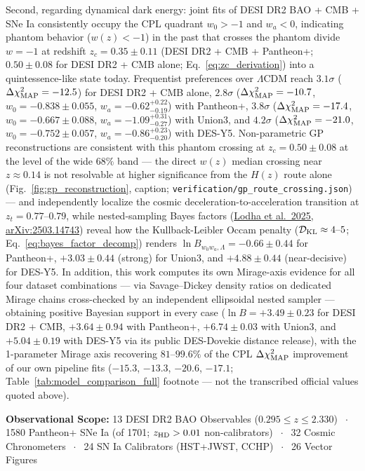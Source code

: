 \documentclass[11pt,letterpaper]{article}
\begin{document}
{Second, regarding dynamical dark energy: joint fits of DESI DR2 BAO + CMB + SNe Ia consistently occupy the CPL quadrant $w_0 > -1$ and $w_a < 0$, indicating phantom behavior ($w(z) < -1$) in the past that crosses the phantom divide $w = -1$ at redshift $z_c = 0.35 \pm 0.11$ (DESI DR2 + CMB + Pantheon+; $0.50 \pm 0.08$ for DESI DR2 + CMB alone; Eq.~\ref{eq:zc_derivation}) into a quintessence-like state today. Frequentist preferences over $\Lambda$CDM reach $3.1\sigma$ ($\Delta\chi^2_{\rm MAP} = -12.5$) for DESI DR2 + CMB alone, $2.8\sigma$ ($\Delta\chi^2_{\rm MAP} = -10.7$, $w_0 = -0.838 \pm 0.055$, $w_a = -0.62^{+0.22}_{-0.19}$) with Pantheon+, $3.8\sigma$ ($\Delta\chi^2_{\rm MAP} = -17.4$, $w_0 = -0.667 \pm 0.088$, $w_a = -1.09^{+0.31}_{-0.27}$) with Union3, and $4.2\sigma$ ($\Delta\chi^2_{\rm MAP} = -21.0$, $w_0 = -0.752 \pm 0.057$, $w_a = -0.86^{+0.23}_{-0.20}$) with DES-Y5. Non-parametric GP reconstructions are consistent with this phantom crossing at $z_c = 0.50 \pm 0.08$ at the level of the wide $68\%$ band --- the direct $w(z)$ median crossing near $z \approx 0.14$ is not resolvable at higher significance from the $H(z)$ route alone (Fig.~\ref{fig:gp_reconstruction}, caption; \texttt{verification/gp\_route\_crossing.json}) --- and independently localize the cosmic deceleration-to-acceleration transition at $z_t = 0.77\text{--}0.79$, while nested-sampling Bayes factors (\href{https://arxiv.org/abs/2503.14743}{Lodha et al.\ 2025, arXiv:2503.14743}) reveal how the Kullback-Leibler Occam penalty ($\mathcal{D}_{\rm KL} \approx 4\text{--}5$; Eq.~\ref{eq:bayes_factor_decomp}) renders $\ln B_{w_0w_a,\Lambda} = -0.66 \pm 0.44$ for Pantheon+, $+3.03 \pm 0.44$ (strong) for Union3, and $+4.88 \pm 0.44$ (near-decisive) for DES-Y5. In addition, this work computes its own Mirage-axis evidence for all four dataset combinations --- via Savage--Dickey density ratios on dedicated Mirage chains cross-checked by an independent ellipsoidal nested sampler --- obtaining positive Bayesian support in every case ($\ln B = +3.49 \pm 0.23$ for DESI DR2 + CMB, $+3.64 \pm 0.94$ with Pantheon+, $+6.74 \pm 0.03$ with Union3, and $+5.04 \pm 0.19$ with DES-Y5 via its public DES-Dovekie distance release), with the 1-parameter Mirage axis recovering $81\text{--}99.6\%$ of the CPL $\Delta\chi^2_{\rm MAP}$ improvement of our own pipeline fits ($-15.3$, $-13.3$, $-20.6$, $-17.1$; Table~\ref{tab:model_comparison_full} footnote --- not the transcribed official values quoted above).
}
\vspace{2pt}
\noindent\colorbox{boxbg}{%
\parbox{\dimexpr\textwidth-2\fboxsep\relax}{%
\centering\footnotesize\color{primary}%
\textbf{Observational Scope:} 13 DESI DR2 BAO Observables ($0.295 \le z \le 2.330$) $\;\cdot\;$ 1580 Pantheon+ SNe Ia (of 1701; $z_{\rm HD} > 0.01$ non-calibrators) $\;\cdot\;$ 32 Cosmic Chronometers $\;\cdot\;$ 24 SN Ia Calibrators (HST+JWST, CCHP) $\;\cdot\;$ 26 Vector Figures%
}%
}
\vspace{4pt}
\noindent{\color{goldaccent}\rule{\textwidth}{1.2pt}}
\end{document}
